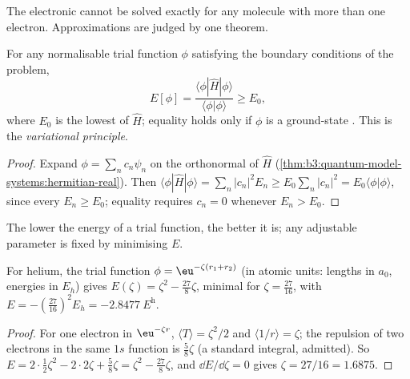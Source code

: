 The electronic  cannot be solved exactly for any
molecule with more than one electron. Approximations are judged by one
theorem.

\begin{theorem}\label{thm:b3:computational-chemistry:variational}
For any normalisable trial function $\phi$ satisfying the boundary
conditions of the problem,
\[
E[\phi] = \frac{\langle\phi|\hat H|\phi\rangle}{\langle\phi|\phi\rangle} \ge E_0,
\]
where $E_0$ is the lowest  of $\hat H$; equality holds only if $\phi$
is a ground-state . This is the \emph{variational
principle}.
\end{theorem}

\begin{proof}
Expand $\phi = \sum_nc_n\psi_n$ on the orthonormal  of $\hat H$
(\cref{thm:b3:quantum-model-systems:hermitian-real}). Then $\langle\phi|\hat
H|\phi\rangle = \sum_n|c_n|^2E_n \ge E_0\sum_n|c_n|^2 = E_0\langle\phi|\phi\rangle$,
since every $E_n \ge E_0$; equality requires $c_n = 0$ whenever $E_n > E_0$.
\end{proof}

The lower the energy of a trial function, the better it is; any adjustable
parameter is fixed by minimising $E$.

\begin{proposition}\label{prop:b3:computational-chemistry:helium-zeta}
For helium, the trial function $\phi = \eu^{-\zeta(r_1 + r_2)}$ (in atomic units:
lengths in $a_0$, energies in $E_h$) gives $E(\zeta) = \zeta^2 - \frac{27}{8}\zeta$,
minimal for $\zeta = \frac{27}{16}$, with $E = -(\frac{27}{16})^2 E_h =
\qty{-2.8477}{\hartree}$.
\end{proposition}

\begin{proof}
For one electron in $\eu^{-\zeta r}$, $\langle T\rangle = \zeta^2/2$ and
$\langle 1/r\rangle = \zeta$; the repulsion of two electrons in the same $1s$
function is $\frac58\zeta$ (a standard integral, admitted). So $E = 2\cdot\frac12
\zeta^2 - 2\cdot2\zeta + \frac58\zeta = \zeta^2 - \frac{27}{8}\zeta$, and $\dd E/\dd
\zeta = 0$ gives $\zeta = 27/16 = 1.6875$.
\end{proof}

